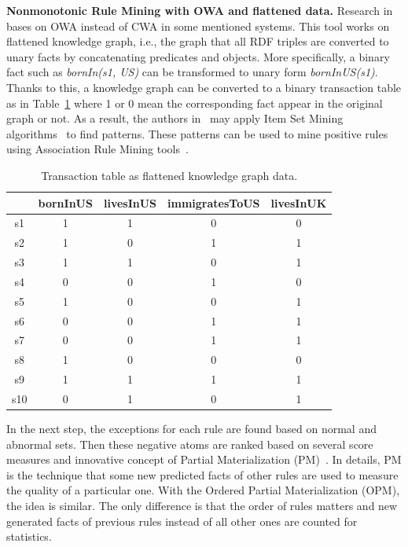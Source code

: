 \textbf{Nonmonotonic Rule Mining with OWA and flattened data.} Research in~\cite{ref12} bases on OWA instead of CWA in some mentioned systems. This tool works on flattened knowledge graph, i.e., the graph that all RDF triples are converted to unary facts by concatenating predicates and objects. More specifically, a binary fact such as \textit{bornIn(s1, US)} can be transformed to unary form \textit{bornInUS(s1)}. Thanks to this, a knowledge graph can be converted to a binary transaction table as in Table~\ref{table2} where 1 or 0 mean the corresponding fact appear in the original graph or not. As a result, the authors in~\cite{ref12} may apply Item Set Mining algorithms~\cite{ref37} to find patterns. These patterns can be used to mine positive rules using Association Rule Mining tools~\cite{ref13}.

\begin{table}
\begin{center}
\begin{tabular}{|c|c|c|c|c|}
\hline
 & bornInUS & livesInUS & immigratesToUS & livesInUK\\
\hline\hline
s1 & 1 & 1 & 0 & 0\\
\hline
s2 & 1 & 0 & 1 & 1\\
\hline
s3 & 1 & 1 & 0 & 1\\
\hline
s4 & 0 & 0 & 1 & 0\\
\hline
s5 & 1 & 0 & 0 & 1\\
\hline
s6 & 0 & 0 & 1 & 1\\
\hline
s7 & 0 & 0 & 1 & 1\\
\hline
s8 & 1 & 0 & 0 & 0\\
\hline
s9 & 1 & 1 & 1 & 1\\
\hline
s10 & 0 & 1 & 0 & 1\\
\hline
\end{tabular}
\end{center}
\caption{Transaction table as flattened knowledge graph data.}
\label{table2}
\end{table}

In the next step, the exceptions for each rule are found based on normal and abnormal sets. Then these negative atoms are ranked based on several score measures and innovative concept of Partial Materialization (PM)~\cite{ref12}. In details, PM is the technique that some new predicted facts of other rules are used to measure the quality of a particular one. With the Ordered Partial Materialization (OPM), the idea is similar. The only difference is that the order of rules matters and new generated facts of previous rules instead of all other ones are counted for statistics.

